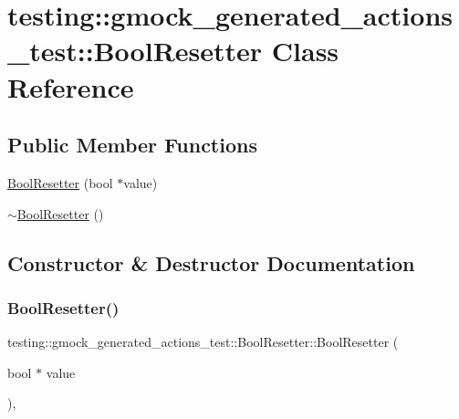 \hypertarget{classtesting_1_1gmock__generated__actions__test_1_1BoolResetter}{}\section{testing\+::gmock\+\_\+generated\+\_\+actions\+\_\+test\+::Bool\+Resetter Class Reference}
\label{classtesting_1_1gmock__generated__actions__test_1_1BoolResetter}
\subsection*{Public Member Functions}
\begin{DoxyCompactItemize}
\item 
\mbox{\hyperlink{classtesting_1_1gmock__generated__actions__test_1_1BoolResetter_a55776cb9ef3b358e48898bb0257646ea}{Bool\+Resetter}} (bool $\ast$value)
\item 
\mbox{\hyperlink{classtesting_1_1gmock__generated__actions__test_1_1BoolResetter_a814afb883394b0fe7d7c8c1aa22d9cb6}{$\sim$\+Bool\+Resetter}} ()
\end{DoxyCompactItemize}


\subsection{Constructor \& Destructor Documentation}
\mbox{\label{classtesting_1_1gmock__generated__actions__test_1_1BoolResetter_a55776cb9ef3b358e48898bb0257646ea}} 
\subsubsection{\texorpdfstring{BoolResetter()}{BoolResetter()}}
{\footnotesize\ttfamily testing\+::gmock\+\_\+generated\+\_\+actions\+\_\+test\+::\+Bool\+Resetter\+::\+Bool\+Resetter (\begin{DoxyParamCaption}\item[{bool $\ast$}]{value }\end{DoxyParamCaption})\hspace{0.3cm}{\ttfamily [inline]}, {\ttfamily [explicit]}}

